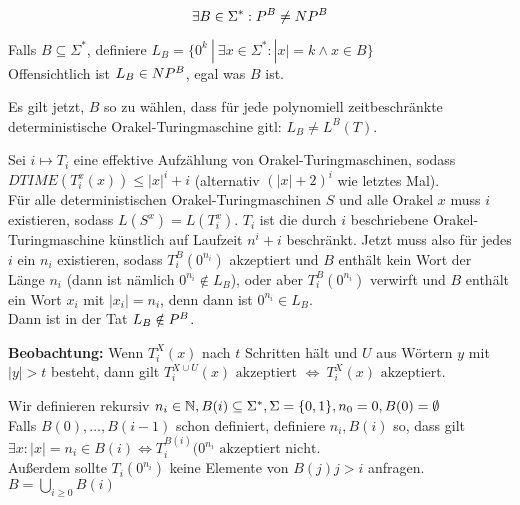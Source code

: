 \begin{satz}
    
    $$ \exists B \in \Sigma^\ast: P^B \neq NP^B $$

\end{satz}

\begin{beweis}
    
    Falls $B \subseteq \Sigma^\ast$, 
    definiere $L_B = \{  0^k \ |\   \exists x \in \Sigma^\ast: |x| = k \land x \in B  \} $ \\
    Offensichtlich ist $L_B \in NP^B$, egal was $B$ ist.

    Es gilt jetzt, $B$ so zu wählen, dass für jede polynomiell zeitbeschränkte deterministische Orakel-Turingmaschine gitl: $L_B \neq L^B(T)$.

    Sei $i \mapsto T_i$ eine effektive Aufzählung von Orakel-Turingmaschinen, sodass $DTIME(T_i^x(x)) \leq |x|^i + i$ (alternativ $(|x| + 2)^i$ wie letztes Mal).\\
    Für alle deterministischen Orakel-Turingmaschinen $S$ und alle Orakel $x$ muss $i$ existieren, sodass $L(S^x) = L(T_i^x)$. $T_i$ ist die durch $i$ beschriebene Orakel-Turingmaschine künstlich auf Laufzeit $n^i + i$ beschränkt. Jetzt muss also für jedes $i$ ein $n_i$ existieren, sodass $T_i^B(0^{n_i})$ akzeptiert und $B$ enthält kein Wort der Länge $n_i$ (dann ist nämlich $0^{n_i} \notin L_B$), oder aber $T_i^B(0^{n_i})$ verwirft und $B$ enthält ein Wort $x_i$ mit $|x_i| = n_i$, denn dann ist $0^{n_i} \in L_B$.\\
    Dann ist in der Tat $L_B \notin P^B$.

    \textbf{Beobachtung:}
    Wenn $T_i^X(x)$ nach $t$ Schritten hält und $U$ aus Wörtern $y$ mit $|y| > t$ besteht, dann gilt 
    $T_i^{X \cup U}(x) \text{ akzeptiert }  \Leftrightarrow  \ T_i^X(x) \text{ akzeptiert}$.



    
    Wir definieren rekursiv $n_i \in \mathbb{N}, B(i) \subseteq \Sigma^\ast, \Sigma = \{0,1\}, n_0 = 0, B(0) = \emptyset$
    \\
    Falls $B(0), \dots, B(i-1)$ schon definiert, definiere $n_i, B(i)$ so, dass gilt $\exists x: |x| = n_i \in B(i) \Leftrightarrow T_i^{B(i)}(0^{n_i} \text{ akzeptiert nicht}$.
    \\
    Außerdem sollte $T_i(0^{n_i})$ keine Elemente von $B(j) j>i$ anfragen.
    \\
    $B = \bigcup_{i \geq 0} B(i)$


\end{beweis}
